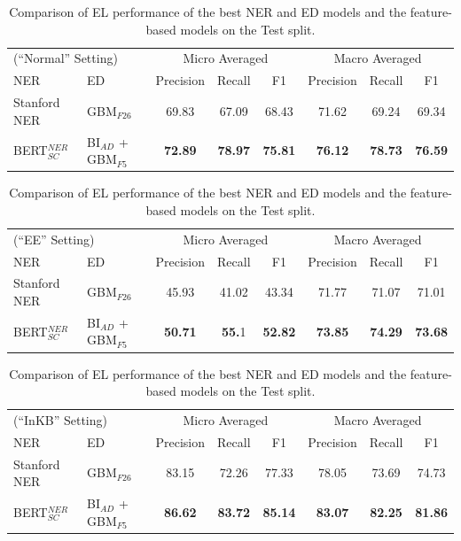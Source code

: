 \documentclass{report}
\theoremstyle{definition}
\theoremstyle{remark}
\begin{document}
\begin{table}
    \centering
    \vspace{-1.5cm}\begin{tabular}{l l c c c| c c c}
    \multicolumn{2}{l}{(``Normal'' Setting)}&\multicolumn{3}{c|}{Micro Averaged}&\multicolumn{3}{c}{Macro Averaged} \\
    NER & ED &Precision&Recall&F1&Precision&Recall&F1\\
    \hline
    Stanford NER& GBM$_{F26}$ & 69.83	&67.09&	68.43&	71.62&	69.24&	69.34
\\
    BERT$_{SC}^{NER}$ & BI$_{AD}$ + GBM$_{F5}$ & \textbf{72.89}&\textbf{78.97}&\textbf{75.81}&\textbf{76.12}&\textbf{78.73}&\textbf{76.59}\\
    \end{tabular}
    
    \vspace{0.5cm}\begin{tabular}{l l c c c| c c c}
    \multicolumn{2}{l}{(``EE'' Setting)}&\multicolumn{3}{c|}{Micro Averaged}&\multicolumn{3}{c}{Macro Averaged} \\
    NER & ED &Precision&Recall&F1&Precision&Recall&F1\\
    \hline
    Stanford NER & GBM$_{F26}$ & 45.93&	41.02&	43.34&	71.77&	71.07	&71.01
\\
    BERT$_{SC}^{NER}$ & BI$_{AD}$ + GBM$_{F5}$ &\textbf{50.71}&\textbf{55.}1&\textbf{52.82}&\textbf{73.85}&\textbf{74.29}&\textbf{73.68} \\
    \end{tabular}
    
    \vspace{0.5cm}\begin{tabular}{l l c c c| c c c}
    \multicolumn{2}{l}{(``InKB'' Setting)}&\multicolumn{3}{c|}{Micro Averaged}&\multicolumn{3}{c}{Macro Averaged} \\
    NER & ED &Precision&Recall&F1&Precision&Recall&F1\\
    \hline
    Stanford NER  & GBM$_{F26}$ & 83.15&	72.26&	77.33&	78.05&	73.69&	74.73
\\
    BERT$_{SC}^{NER}$ & BI$_{AD}$ + GBM$_{F5}$ &\textbf{86.62}&\textbf{83.72}&\textbf{85.14}&\textbf{83.07}&\textbf{82.25}&\textbf{81.86} \\
    \end{tabular}
    \caption{Comparison of EL performance of the best NER and ED models and the feature-based models on the Test split.}
    \label{tab:elresultstest}
\end{table}
\end{document}
